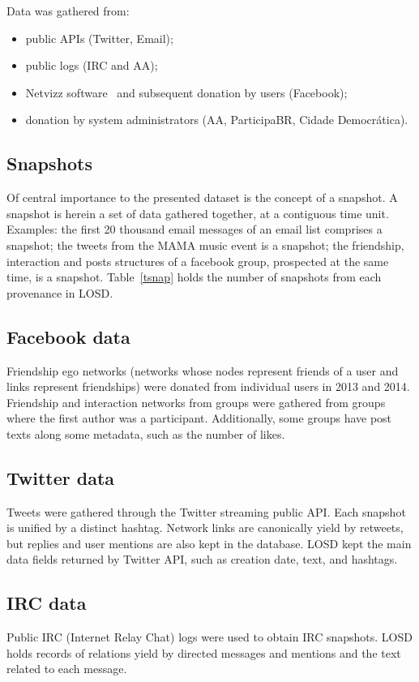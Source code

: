 \documentclass[data,datadescriptor,submit,moreauthors,pdftex]{Definitions/mdpi}
\begin{document}
\noindent Data was gathered from:
\begin{itemize}
    \item public APIs (Twitter, Email);
    \item public logs (IRC and AA);
    \item Netvizz software~\cite{netvizz} and subsequent donation by users (Facebook);
    \item donation by system administrators (AA, ParticipaBR, Cidade Democr\'atica).
\end{itemize}

\subsection{Snapshots}
Of central importance to the presented dataset is the concept of a snapshot.
A snapshot is herein a set of data gathered together, at a contiguous time
unit.
Examples: the first 20 thousand email messages of an email list
comprises a snapshot; the tweets from the MAMA music event is a
snapshot; the friendship, interaction and posts structures of a facebook
group, prospected at the same time, is a snapshot.
Table~\ref{tsnap} holds the number of snapshots from each provenance in LOSD.



\subsection{Facebook data}
Friendship ego networks (networks whose nodes represent friends of a user and links represent friendships)
were donated from individual users in 2013 and 2014.
Friendship and interaction networks from groups were gathered from
groups where the first author was a participant.
Additionally, some groups have post texts along some metadata, such as
the number of likes.

\subsection{Twitter data}
Tweets were gathered through the Twitter streaming public API.
Each snapshot is unified by a distinct hashtag.
Network links are canonically yield by retweets,
but replies and user mentions are also kept in the database.
LOSD kept the main data fields returned by Twitter API, such as creation date, text, and hashtags.

\subsection{IRC data}
Public IRC (Internet Relay Chat) logs were used to obtain IRC snapshots.
LOSD holds records of relations yield by directed messages and
mentions and the text related to each message.
\end{document}
